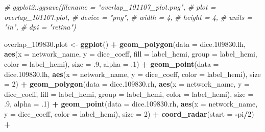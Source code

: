 \documentclass[
]{article}
\newenvironment{Shaded}{\begin{snugshade}}{\end{snugshade}}
\newcommand{\CommentTok}[1]{\textcolor[rgb]{0.56,0.35,0.01}{\textit{#1}}}
\newcommand{\DataTypeTok}[1]{\textcolor[rgb]{0.13,0.29,0.53}{#1}}
\newcommand{\DecValTok}[1]{\textcolor[rgb]{0.00,0.00,0.81}{#1}}
\newcommand{\FloatTok}[1]{\textcolor[rgb]{0.00,0.00,0.81}{#1}}
\newcommand{\KeywordTok}[1]{\textcolor[rgb]{0.13,0.29,0.53}{\textbf{#1}}}
\newcommand{\NormalTok}[1]{#1}
\newcommand{\OperatorTok}[1]{\textcolor[rgb]{0.81,0.36,0.00}{\textbf{#1}}}
\newcommand{\StringTok}[1]{\textcolor[rgb]{0.31,0.60,0.02}{#1}}
\begin{document}
\begin{Shaded}
\begin{Highlighting}[]
\CommentTok{# ggplot2::ggsave(filename = "overlap_101107_plot.png",}
\CommentTok{#                 plot = overlap_101107.plot,}
\CommentTok{#                 device = "png",}
\CommentTok{#                 width = 4,}
\CommentTok{#                 height = 4, }
\CommentTok{#                 units = "in",}
\CommentTok{#                 dpi = "retina")}


\NormalTok{overlap_}\FloatTok{109830.}\NormalTok{plot <-}\StringTok{ }\KeywordTok{ggplot}\NormalTok{() }\OperatorTok{+}\StringTok{  }
\StringTok{  }\KeywordTok{geom_polygon}\NormalTok{(}\DataTypeTok{data =}\NormalTok{ dice.}\FloatTok{109830.}\NormalTok{lh, }\KeywordTok{aes}\NormalTok{(}\DataTypeTok{x =}\NormalTok{ network_name, }\DataTypeTok{y =}\NormalTok{ dice_coeff, }\DataTypeTok{fill =}\NormalTok{ label_hemi, }\DataTypeTok{group =}
\NormalTok{                                            label_hemi, }\DataTypeTok{color =}\NormalTok{ label_hemi), }\DataTypeTok{size =} \FloatTok{.9}\NormalTok{, }\DataTypeTok{alpha =} \FloatTok{.1}\NormalTok{) }\OperatorTok{+}
\StringTok{  }\KeywordTok{geom_point}\NormalTok{(}\DataTypeTok{data =}\NormalTok{ dice.}\FloatTok{109830.}\NormalTok{lh, }\KeywordTok{aes}\NormalTok{(}\DataTypeTok{x =}\NormalTok{ network_name, }\DataTypeTok{y =}\NormalTok{ dice_coeff, }\DataTypeTok{color =}\NormalTok{ label_hemi), }\DataTypeTok{size =} \DecValTok{2}\NormalTok{) }\OperatorTok{+}\StringTok{ }
\StringTok{  }\KeywordTok{geom_polygon}\NormalTok{(}\DataTypeTok{data =}\NormalTok{ dice.}\FloatTok{109830.}\NormalTok{rh, }\KeywordTok{aes}\NormalTok{(}\DataTypeTok{x =}\NormalTok{ network_name, }\DataTypeTok{y =}\NormalTok{ dice_coeff, }\DataTypeTok{fill =}\NormalTok{ label_hemi, }\DataTypeTok{group =}
\NormalTok{                                            label_hemi, }\DataTypeTok{color =}\NormalTok{ label_hemi), }\DataTypeTok{size =} \FloatTok{.9}\NormalTok{, }\DataTypeTok{alpha =} \FloatTok{.1}\NormalTok{) }\OperatorTok{+}
\StringTok{  }\KeywordTok{geom_point}\NormalTok{(}\DataTypeTok{data =}\NormalTok{ dice.}\FloatTok{109830.}\NormalTok{rh, }\KeywordTok{aes}\NormalTok{(}\DataTypeTok{x =}\NormalTok{ network_name, }\DataTypeTok{y =}\NormalTok{ dice_coeff, }\DataTypeTok{color =}\NormalTok{ label_hemi), }\DataTypeTok{size =} \DecValTok{2}\NormalTok{) }\OperatorTok{+}\StringTok{ }
\StringTok{  }
\StringTok{  }\KeywordTok{coord_radar}\NormalTok{(}\DataTypeTok{start =} \OperatorTok{-}\NormalTok{pi}\OperatorTok{/}\DecValTok{2}\NormalTok{) }\OperatorTok{+}

\end{Highlighting}
\end{Shaded}
\end{document}
